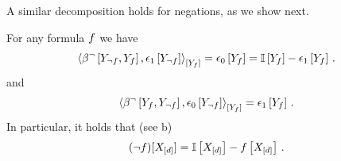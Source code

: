 A similar decomposition holds for negations, as we show next.

\begin{theorem}
    For any formula $f$ we have
    \begin{align*}
        \contractionof{
            \bencodingofat{\lnot}{\headvariableof{\lnot\exformula},\formulavar},\tbasisat{\headvariableof{\lnot\exformula}}
        }{\formulavar}
        = \fbasisat{\formulavar} =  \onesat{\formulavar} - \tbasisat{\formulavar} \, .
    \end{align*}
    and
    \begin{align*}
        \contractionof{
            \bencodingofat{\lnot}{\formulavar,\headvariableof{\lnot\exformula}},\fbasisat{\headvariableof{\lnot\exformula}}
        }{\formulavar}
        = \tbasisat{\formulavar} \, .
    \end{align*}
    In particular, it holds that (see b)
    \begin{align*}
    (\lnot f)[X_{[d]}]
        = \mathbb{I}\left[X_{[d]}\right] - f\left[X_{[d]}\right]  \, .
    \end{align*}
\end{theorem}
